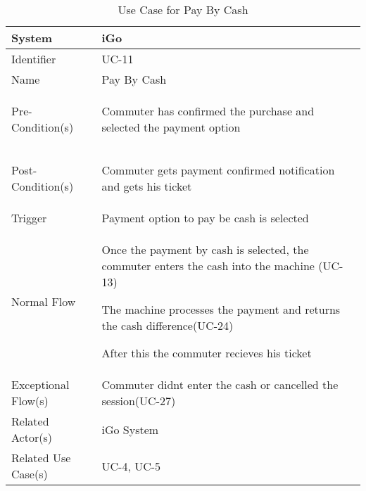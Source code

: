 \begin{table}[ht]
    \centering
    \begin{tabular}{|l|p{11cm}|}
        \hline
        System             & iGo\\
        \hline
        Identifier         & UC-11 \\
        \hline
        Name               & Pay By Cash \\
        \hline
        Pre-Condition(s)   & 
        \begin{enumerate*}[itemjoin=\newline]
            \item Commuter has confirmed the purchase and selected the payment option
        \end{enumerate*} \\
        \hline
        Post-Condition(s)  & 
        \begin{enumerate*}[itemjoin=\newline]
            \item Commuter gets payment confirmed notification and gets his ticket
        \end{enumerate*} \\
        \hline
        Trigger            & Payment option to pay be cash is selected \\
        \hline
        Normal Flow        & 
        \begin{enumerate*}[itemjoin=\newline]
            \item Once the payment by cash is selected, the commuter enters the cash into the machine (UC-13)
            \item The machine processes the payment and returns the cash difference(UC-24)
            \item After this the commuter recieves his ticket
        \end{enumerate*} \\
        \hline
        Exceptional Flow(s)& Commuter didnt enter the cash or cancelled the session(UC-27)\\
        \hline
        Related Actor(s)   & iGo System \\
        \hline
        Related Use Case(s)& UC-4, UC-5\\
        \hline
    \end{tabular}
    \caption{Use Case for Pay By Cash}
    \label{tab:UC_PayByCash}
\end{table}

